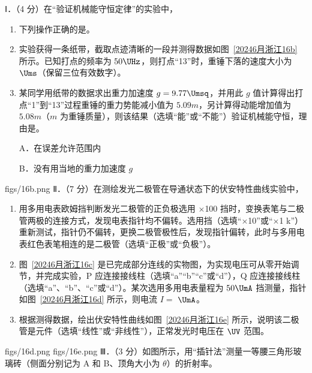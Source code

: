 \documentclass[\gkver]{gaokaozhenti}
\begin{document}
\begin{enumerate}
Ⅰ．（4 分）在“验证机械能守恒定律”的实验中，

\begin{enumerate}
	\item
	下列操作正确的是。
	\item
	实验获得一条纸带，截取点迹清晰的一段并测得数据如图~\ref{20246月浙江16b} 所示。已知打点的频率为 $50\UHz$，则打点“13”时，重锤下落的速度大小为 $\Ums$（保留三位有效数字）。
	\item
	某同学用纸带的数据求出重力加速度 $g = 9.77\Umsq$，并用此 $g$ 值计算得出打点“1”到“13”过程重锤的重力势能减小值为 $5.09m$，另计算得动能增加值为 $5.08m$（$m$ 为重锤质量），则该结果（选填“能”或“不能”）验证机械能守恒，理由是。

	A．在误差允许范围内

	B．没有用当地的重力加速度 $g$
\end{enumerate}
\twopicture[labelA=20246月浙江16a, labelB=20246月浙江16b, align=right, hA=2.30cm, wB=10.62cm]
{}
{figs/16b.png}
Ⅱ．（7 分）在测绘发光二极管在导通状态下的伏安特性曲线实验中，

\begin{enumerate}
	\item
	用多用电表欧姆挡判断发光二极管的正负极选用 $\times$100 挡时，变换表笔与二极管两极的连接方式，发现电表指针均不偏转。选用挡（选填“$\times$10”或“$\times$1 k”）重新测试，指针仍不偏转，更换二极管极性后，发现指针偏转，此时与多用电表红色表笔相连的是二极管（选填“正极”或“负极”）。
	\item
	图~\ref{20246月浙江16c} 是已完成部分连线的实物图，为实现电压可从零开始调节，并完成实验，P 应连接接线柱（选填“a”“b”“c”或“d”），Q 应连接接线柱（选填“a”、“b”、“c”或“d”）。某次选用多用电表量程为 $50\UmA$ 挡测量，指针如图~\ref{20246月浙江16d} 所示，则电流 $I = $ $\UmA$。
	\item
	根据测得数据，绘出伏安特性曲线如图~\ref{20246月浙江16e} 所示，说明该二极管是元件（选填“线性”或“非线性”），正常发光时电压在 $\UV$ 范围。
\end{enumerate}
{figs/16d.png}
{figs/16e.png}
Ⅲ．（3 分）如图所示，用“插针法”测量一等腰三角形玻璃砖（侧面分别记为 A 和 B、顶角大小为 $\theta$）的折射率。


\end{enumerate}
\end{document}

